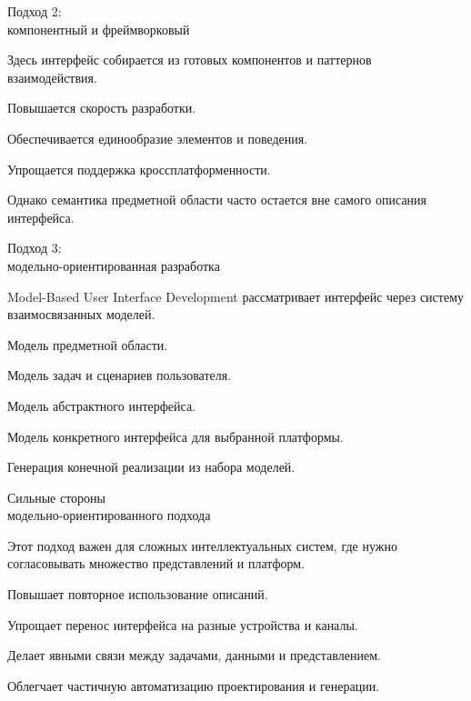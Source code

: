 \begin{frame}{Подход 2:\\ компонентный и фреймворковый}
	\topline
	\justifying

	Здесь интерфейс собирается из готовых компонентов и паттернов взаимодействия.
	
	\begin{textitemize}
		\item Повышается скорость разработки.
		\item Обеспечивается единообразие элементов и поведения.
		\item Упрощается поддержка кроссплатформенности.
		\item Однако семантика предметной области часто остается вне самого описания интерфейса.
	\end{textitemize}
\end{frame}

\begin{frame}{Подход 3:\\ модельно-ориентированная разработка}
	\topline
	\justifying

	Model-Based User Interface Development рассматривает интерфейс через систему взаимосвязанных моделей.
	
	\begin{textitemize}
		\item Модель предметной области.
		\item Модель задач и сценариев пользователя.
		\item Модель абстрактного интерфейса.
		\item Модель конкретного интерфейса для выбранной платформы.
		\item Генерация конечной реализации из набора моделей.
	\end{textitemize}
\end{frame}

\begin{frame}{Сильные стороны\\ модельно-ориентированного подхода}
	\topline
	\justifying

	Этот подход важен для сложных интеллектуальных систем, где нужно согласовывать множество представлений и платформ.
	
	\begin{textitemize}
		\item Повышает повторное использование описаний.
		\item Упрощает перенос интерфейса на разные устройства и каналы.
		\item Делает явными связи между задачами, данными и представлением.
		\item Облегчает частичную автоматизацию проектирования и генерации.
	\end{textitemize}
\end{frame}


